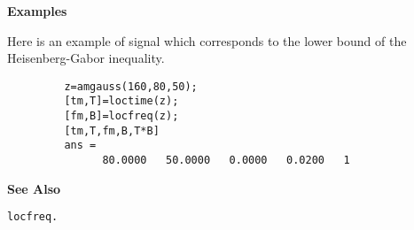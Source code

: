 {\bf \large {}\selectfont Examples}\\
\hspace*{1.5cm}
\begin{minipage}[t]{13.5cm}
Here is an example of signal which corresponds to the lower bound of the
Heisenberg-Gabor inequality.
\begin{verbatim}
         z=amgauss(160,80,50); 
         [tm,T]=loctime(z); 
         [fm,B]=locfreq(z);
         [tm,T,fm,B,T*B]
         ans = 
               80.0000   50.0000   0.0000   0.0200   1
\end{verbatim}
\end{minipage}
\vspace*{.5cm}


{\bf \large {}\selectfont See Also}\\
\hspace*{1.5cm}
\begin{minipage}[t]{13.5cm}
\begin{verbatim}
locfreq.
\end{verbatim}
\end{minipage}




